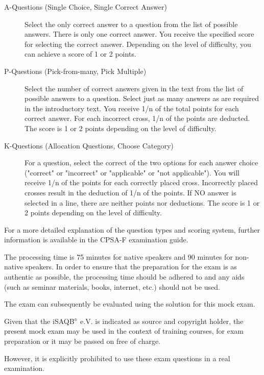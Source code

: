 \documentclass[12pt,a4paper]{article}
\newcounter{examQuestion}\setcounter{examQuestion}{1}
\newcommand{\registered}{$^\textrm{\tiny\textregistered}$}
\begin{document}
\begin{description}
\item[A-Questions (Single Choice, Single Correct Answer)] Select the
  only correct answer to a question from the list of possible
  answers. There is only one correct answer. You receive the specified
  score for selecting the correct answer. Depending on the level of
  difficulty, you can achieve a score of 1 or 2 points.
\item[P-Questions (Pick-from-many, Pick Multiple)] Select the number
  of correct answers given in the text from the list of possible
  answers to a question. Select just as many answers as are required
  in the introductory text. You receive 1/n of the total points for
  each correct answer. For each incorrect cross, 1/n of the points are
  deducted. The score is 1 or 2 points depending on the level of
  difficulty.
\item[K-Questions (Allocation Questions, Choose Category)] For a
  question, select the correct of the two options for each answer
  choice ("correct" or "incorrect" or "applicable" or "not
  applicable"). You will receive 1/n of the points for each correctly
  placed cross. Incorrectly placed crosses result in the deduction of
  1/n of the points. If NO answer is selected in a line, there are
  neither points nor deductions. The score is 1 or 2 points depending
  on the level of difficulty.
\end{description}

For a more detailed explanation of the question types and scoring
system, further information is available in the CPSA-F examination
guide.

The processing time is 75 minutes for native speakers and 90 minutes
for non-native speakers. In order to ensure that the preparation for
the exam is as authentic as possible, the processing time should be
adhered to and any aids (such as seminar materials, books, internet,
etc.) should not be used.

The exam can subsequently be evaluated using the solution for this
mock exam.

Given that the iSAQB\registered{} e.V. is indicated as source and copyright
holder, the present mock exam may be used in the context of training
courses, for exam preparation or it may be passed on free of charge.

However, it is explicitly prohibited to use these exam questions in a
real examination.

\newpage

\setcounter{examQuestion}{1}

\end{document}
